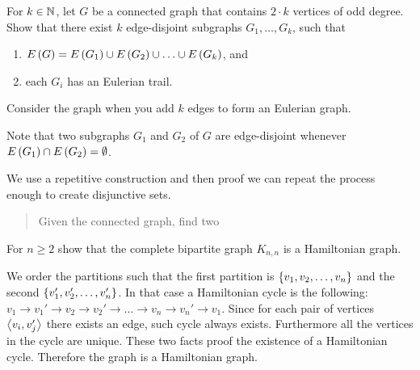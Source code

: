 \documentclass{article}
\begin{document}
\begin{exercise}
For $k\in\mathbb{N}$, let $G$ be a connected graph that contains $2\cdot k$ vertices of odd degree. Show that there exist $k$ edge-disjoint subgraphs $G_1,\ldots,G_k$, such that
\begin{enumerate}
 \item $E\left( G \right)=E\left( G_1 \right)\cup E\left( G_2 \right)\cup\ldots\cup E\left( G_k \right)$, and
 \item each $G_i$ has an Eulerian trail.
\end{enumerate}
\begin{hint}
Consider the graph when you add $k$ edges to form an Eulerian graph.
\end{hint}
\begin{note}
Note that two subgraphs $G_1$ and $G_2$ of $G$ are edge-disjoint whenever $E\left( G_1 \right)\cap E\left( G_2 \right)=\emptyset$.
\begin{answer}
We use a repetitive construction and then proof we can repeat the process enough to create disjunctive sets.
\begin{quote}\begin{construction}
Given the connected graph, find two 
\end{construction}\end{quote}
\end{answer}
\end{note}
\end{exercise}

\begin{exercise}
For $n\geq2$ show that the complete bipartite graph $K_{n,n}$ is a Hamiltonian graph.
\begin{answer}
We order the partitions such that the first partition is $\left\{ v_1,v_2,\ldots,v_n \right\}$ and the second $\left\{ v_1',v_2',\ldots,v_n' \right\}$. In that case a Hamiltonian cycle is the following: $v_1\rightarrow v_1'\rightarrow v_2\rightarrow v_2'\rightarrow\ldots\rightarrow v_n\rightarrow v_n'\rightarrow v_1$. Since for each pair of vertices $\left\langle v_i,v_j' \right\rangle$ there exists an edge, such cycle always exists. Furthermore all the vertices in the cycle are unique. These two facts proof the existence of a Hamiltonian cycle. Therefore the graph is a Hamiltonian graph.
\end{answer}
\end{exercise}
\end{document}
